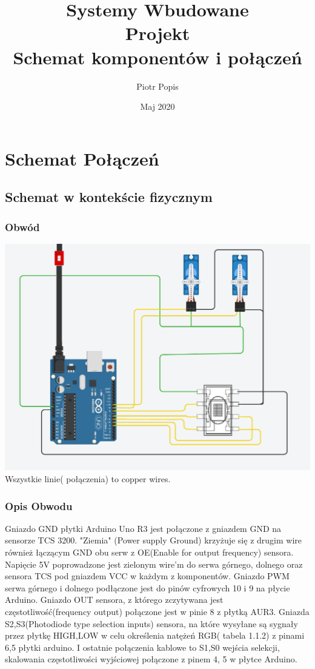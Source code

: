 \documentclass[12pt]{article}
\title{Systemy Wbudowane\\
   Projekt\\
   Schemat komponentów i połączeń}
\author{Piotr Popis}
\date{Maj 2020}
\begin{document}
\begin{titlepage}
\maketitle
\end{titlepage}

\section{Schemat Połączeń}
\subsection{Schemat w kontekście fizycznym}
\subsubsection{Obwód}
\hspace{-2.75cm}%
    \includegraphics[scale=0.5]{circuit_better.png}
Wszystkie linie( połączenia) to copper wires. 
\newpage
\subsubsection{Opis Obwodu}
Gniazdo GND płytki Arduino Uno R3 jest połączone z gniazdem GND na sensorze TCS 3200. "Ziemia" (Power supply Ground) krzyżuje się z drugim wire również łączącym GND obu serw z OE(Enable for output frequency) sensora. Napięcie 5V poprowadzone jest zielonym wire'm do serwa górnego, dolnego oraz sensora TCS pod gniazdem VCC w każdym z komponentów. Gniazdo PWM  serwa górnego i dolnego podłączone jest do pinów cyfrowych 10 i 9 na płycie Arduino. Gniazdo OUT sensora, z którego zczytywana jest częstotliwość(frequency output) połączone jest w pinie 8 z płytką AUR3. Gniazda S2,S3(Photodiode type selection inputs) sensora, na które wysyłane są sygnały przez płytkę HIGH,LOW w celu określenia natężeń RGB( tabela 1.1.2) z pinami 6,5 płytki arduino. I ostatnie połączenia kablowe to S1,S0 wejścia selekcji, skalowania częstotliwości wyjściowej połączone z pinem 4, 5 w płytce Arduino.
\end{document}
